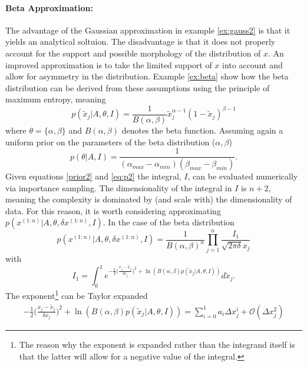 \begin{example}
	\paragraph{Beta Approximation:} The advantage of the Gaussian approximation in example \ref{ex:gauss2} is that it yields an analytical soltuion. The disadvantage is that it does not properly account for the support and possible morphology of the distribution of $x$. An improved approximation is to take the limited support of $x$ into account and allow for asymmetry in the distribution. Example \ref{ex:beta} show how the beta distribution can be derived from these assumptions using the principle of maximum entropy, meaning\label{sec:beta}
	\begin{equation}
		p(\tilde{x}_j|A,\theta, I) = \frac{1}{B(\alpha,\beta)} \tilde{x}_j^{\alpha-1}(1-\tilde{x}_j)^{\beta-1}
		\label{eq:p2}
	\end{equation}
	where $\theta =\{\alpha,\beta\}$ and $B(\alpha,\beta)$ denotes the beta function. Assuming again a uniform prior on the parameters of the beta distribution ($\alpha,\beta$)
	\begin{equation}
		p(\theta|A,I) = \frac{1}{(\alpha_{max}-\alpha_{min})(\beta_{max}-\beta_{min})}.
		\label{prior2}
	\end{equation}
	Given equations \eqref{prior2} and \eqref{eq:p2} the integral, $I$, can be evaluated numerically via importance sampling. The dimensionality of the integral in $I$ is $n+2$, meaning the complexity is dominated by (and scale with) the dimensionality of data. For this reason, it is worth considering approximating $p(x^{(1:n)}|A,\theta,\delta x^{(1:n)}, I)$. In the case of the beta distribution 
	\begin{equation}
		p(x^{(1:n)}|A,\theta,\delta x^{(1:n)}, I) =\frac{1}{B(\alpha,\beta)^n}\prod_{j=1}^{n}\frac{I_1}{\sqrt{2\pi \delta} x_j}
		\label{likelihood2}
	\end{equation}
	with
	\begin{equation}
		I_1 = \int_0^1e^{-\frac{1}{2}\big(\frac{x_j-\tilde{x}_j}{\delta x_j}\big)^2+\ln(B(\alpha,\beta) p(\tilde{x}_j|A,\theta, I))}d\tilde{x}_j.
	\end{equation}
	The exponent\footnote{The reason why the exponent is expanded rather than the integrand itself is that the latter will allow for a negative value of the integral.} can be Taylor expanded
	\begin{equation}
		\begin{split}
			-\frac{1}{2}\big(\frac{x_j-\tilde{x}_j}{\delta x_j}\big)^2+\ln(B(\alpha,\beta) p(\tilde{x}_j|A,\theta, I)) = \sum_{i=0}^{1} a_i\Delta x_j^i+\mathcal{O}(\Delta x_j^2)

\end{split}
\end{equation}
\end{example}
